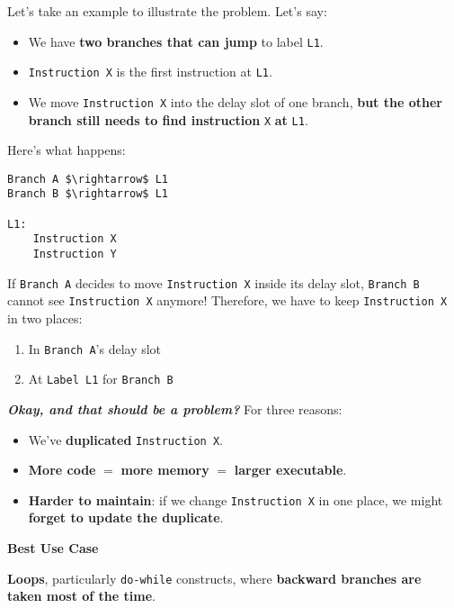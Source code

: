 \highspace
Let's take an example to illustrate the problem. Let's say:
\begin{itemize}
    \item We have \textbf{two branches that can jump} to label \texttt{L1}.
    \item \texttt{Instruction X} is the first instruction at \texttt{L1}.
    \item We move \texttt{Instruction X} into the delay slot of one branch, \textbf{but the other branch still needs to find instruction} \texttt{X} \textbf{at} \texttt{L1}.
\end{itemize}
Here's what happens:
\begin{lstlisting}[language=riscv, mathescape=true]
Branch A $\rightarrow$ L1
Branch B $\rightarrow$ L1

L1:
    Instruction X
    Instruction Y
\end{lstlisting}
If \texttt{Branch A} decides to move \texttt{Instruction X} inside its delay slot, \texttt{Branch B} cannot see \texttt{Instruction X} anymore! Therefore, we have to keep \texttt{Instruction X} in two places:
\begin{enumerate}
    \item In \texttt{Branch A}'s delay slot
    \item At \texttt{Label L1} for \texttt{Branch B}
\end{enumerate}
\textcolor{Red2}{\emph{\textbf{Okay, and that should be a problem?}}} For three reasons:
\begin{itemize}
    \item We've \textbf{duplicated} \texttt{Instruction X}.
    \item \textbf{More code} $=$ \textbf{more memory} $=$ \textbf{larger executable}.
    \item \textbf{Harder to maintain}: if we change \texttt{Instruction X} in one place, we might \textbf{forget to update the duplicate}.
\end{itemize}

\highspace
\begin{flushleft}
    \textcolor{Green3}{ \textbf{Best Use Case}}
\end{flushleft}
\textbf{Loops}, particularly \texttt{do-while} constructs, where \textbf{backward branches are taken most of the time}.
